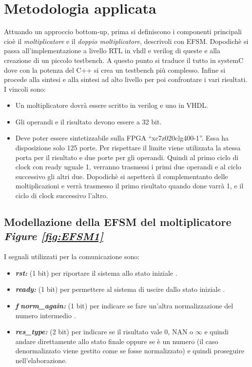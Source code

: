 \documentclass[]{IEEEtran}
\begin{document}
\section{Metodologia applicata}
Attuando un approccio bottom-up, prima si definiscono i componenti principali cioè il {\it moltiplicatore} e il {\it doppio moltiplicatore}, descrivoli con EFSM. Dopodichè si passa all'implementazione a livello RTL in vhdl e verilog di queste e alla creazione di un piccolo testbench. A questo punto si traduce il tutto in systemC dove con la potenza del C++ si crea un testbench più complesso. Infine si procede alla sintesi e alla sintesi ad alto livello per poi confrontare i vari risultati.
I vincoli sono:
\begin{itemize}
\item Un moltiplicatore dovrà essere scritto in verilog e uno in VHDL.
\item Gli operandi e il risultato devono essere a 32 bit.
\item Deve poter essere sintetizzabile sulla FPGA  ``xc7z020clg400-1''. Essa ha disposizione solo 125 porte. Per rispettare il limite viene utilizzata la stessa porta per il risultato e due porte per gli operandi. Quindi al primo ciclo di clock con ready uguale 1, verranno trasmessi i primi due operandi e al ciclo successivo gli altri due. Dopodichè si aspetterà il complementanto delle moltiplicazioni e verrà trasmesso il primo risultato quando done varrà 1, e il ciclo di clock successivo l'altro.
\end{itemize}

\subsection{Modellazione della EFSM del moltiplicatore {\it Figure \ref{fig:EFSM1}}}
I segnali utilizzati per la comunicazione sono:
\begin{itemize}
\item \textit{\textbf{rst:}} (1 bit) per riportare il sistema allo stato iniziale .
\item {\it\bf ready:} (1 bit) per permettere al sistema di uscire dallo stato iniziale .
\item \textbf{\textit{f}} {\it {\bf norm\_again:} } (1 bit) per indicare se fare un'altra normalizzazione del numero intermedio .
\item {\it\bf res\_type:} (2 bit) per indicare se il risultato vale 0, NAN o \(\infty\) e quindi andare direttamente allo stato finale oppure se è un numero (il caso denormalizzato viene gestito come se fosse normalizzato) e quindi proseguire nell'elaborazione.
\end{itemize}
\end{document}
